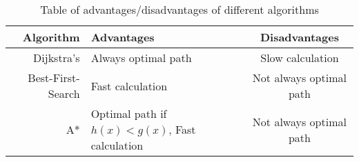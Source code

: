   \begin{table}[ht!]
    \centering
    \begin{tabular}{|r|l|c|}

      \hline
      \textbf{Algorithm} & \textbf{Advantages} & \textbf{Disadvantages} \\
      \hline
      Dijkstra's & Always optimal path & Slow calculation \\
      Best-First-Search & Fast calculation & Not always optimal path \\
      A* & Optimal path if $h(x)<g(x)$, Fast calculation & Not always optimal path \\
      \hline
    \end{tabular}
    \caption{Table of advantages/disadvantages of different algorithms}
    \label{tbl:scheme}
  \end{table}